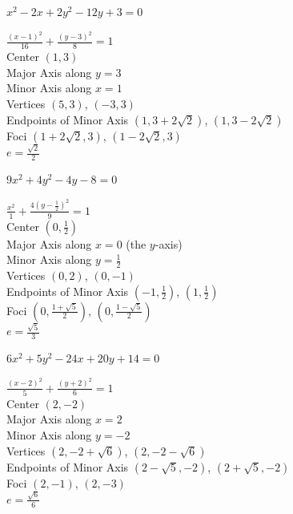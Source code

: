 \documentclass{ximera}
\begin{document}
\begin{question}
\begin{problem}
     $x^2 - 2x + 2y^2 - 12y + 3 = 0$

\begin{solution}
    $\frac{(x - 1)^{2}}{16} + \frac{(y - 3)^{2}}{8} = 1$\\
Center  $(1,3)$ \\
Major Axis along $y=3$\\
Minor Axis along $x=1$\\
Vertices $(5, 3)$, $(-3,3)$\\
Endpoints of Minor Axis $(1,3+2\sqrt{2})$, $(1,3-2\sqrt{2})$\\
Foci $(1 + 2 \sqrt{2}, 3)$, $(1-2 \sqrt{2},3)$\\
$e = \frac{\sqrt{2}}{2}$
\end{solution}
\end{problem}

\begin{problem}\label{oddellipsethirteen}
     $9x^2 + 4y^2 - 4y - 8 = 0$   

\begin{solution}
    $\frac{x^2}{1} + \frac{4\left(y-\frac{1}{2}\right)^2}{9} = 1$\\
Center  $\left(0, \frac{1}{2} \right)$\\
Major Axis along $x=0$ (the $y$-axis)\\
Minor Axis along $y=\frac{1}{2}$\\
Vertices  $\left( 0, 2   \right)$, $(0, -1)$\\
Endpoints of Minor Axis $\left(-1, \frac{1}{2} \right)$, $\left(1, \frac{1}{2} \right)$\\
Foci $\left(0, \frac{1+\sqrt{5}}{2}\right)$, $\left(0, \frac{1-\sqrt{5}}{2}\right)$\\
$e = \frac{\sqrt{5}}{3}$
\end{solution}
\end{problem}

\begin{problem}\label{stdformellipseexlast}
     $6x^2+5y^2-24x+20y+14=0$  

\begin{solution}
    $\frac{(x-2)^2}{5} + \frac{\left(y+2\right)^2}{6} = 1$\\
Center  $\left(2, -2 \right)$\\
Major Axis along $x=2$\\
Minor Axis along $y=-2$\\
Vertices  $\left( 2, -2+\sqrt{6}   \right)$, $(2, -2-\sqrt{6})$\\
Endpoints of Minor Axis $\left(2-\sqrt{5},-2 \right)$, $\left(2+\sqrt{5},-2\right)$\\
Foci $\left(2,-1 \right)$, $\left(2, -3\right)$\\
$e = \frac{\sqrt{6}}{6}$
\end{solution}
\end{problem}


\end{question}
\end{document}
